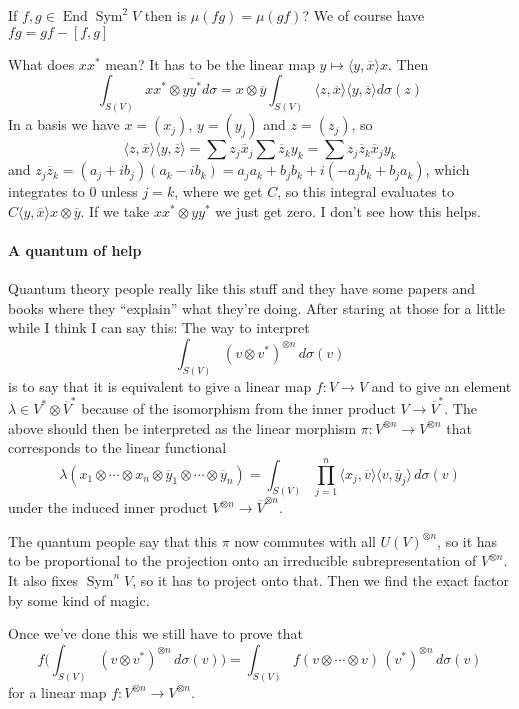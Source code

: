 \documentclass[11pt]{article}
\theoremstyle{definition}
\def\ov#1{\overline{#1}}
\DeclareMathOperator{\End}{End}
\DeclareMathOperator{\Sym}{Sym}
\begin{document}
If $f,g \in \End \Sym^2 V$ then is $\mu(fg) = \mu(gf)$?
We of course have $fg = gf - [f, g]$

What does $xx^*$ mean?
It has to be the linear map $y \mapsto \langle y, \ov x \rangle x$.
Then
$$
\int_{S(V)} x x^* \otimes \ov{yy^*} d\sigma
= x \otimes \ov y \int_{S(V)}
\langle z, \ov x \rangle \langle y, \ov z \rangle d\sigma(z)
$$
In a basis we have $x = (x_j)$, $y = (y_j)$ and $z = (z_j)$, so
$$
\langle z, \ov x \rangle \langle y, \ov z \rangle
= \sum z_j \ov x_j \sum \ov z_k y_k
= \sum z_j \ov z_k \ov x_j y_k
$$
and $z_j \ov z_k = (a_j + ib_j)(a_k - ib_k) = a_ja_k + b_j b_k + i(- a_jb_k +
b_j a_k)$, which integrates to $0$ unless $j = k$, where we get $C$, so this
integral evaluates to $C \langle y, \ov x \rangle x \otimes \ov y$.
If we take $xx^* \otimes yy^*$ we just get zero.
I don't see how this helps.


\paragraph{A quantum of help}

Quantum theory people really like this stuff and they have some papers and
books where they ``explain'' what they're doing.
After staring at those for a little while I think I can say this:
The way to interpret
$$
\int_{S(V)} (v \otimes v^*)^{\otimes n} \, d\sigma(v)
$$
is to say that it is equivalent to give a linear map $f : V \to V$ and to give
an element $\lambda \in V^* \otimes \ov V^*$ because of the isomorphism from
the inner product $V \to \ov V^*$.
The above should then be interpreted as the linear morphism
$\pi : V^{\otimes n} \to V^{\otimes n}$
that corresponds to the linear functional
$$
\lambda(x_1 \otimes \cdots \otimes x_n
\otimes
\ov y_1 \otimes \cdots \otimes \ov y_n)
=
\int_{S(V)} \prod_{j=1}^n
\langle x_j, \ov v \rangle \langle v , \ov y_j \rangle \, d\sigma(v)
$$
under the induced inner product $V^{\otimes n} \to \ov V^{\otimes n}$.

The quantum people say that this $\pi$ now commutes with all $U(V)^{\otimes n}$,
so it has to be proportional to the projection onto an irreducible
subrepresentation of $V^{\otimes n}$.
It also fixes $\Sym^n V$, so it has to project onto that.
Then we find the exact factor by some kind of magic.

Once we've done this we still have to prove that
$$
f\biggl(
\int_{S(V)} (v \otimes v^*)^{\otimes n} \, d\sigma(v)
\biggr)
= \int_{S(V)} f(v \otimes \cdots \otimes v) \, (v^*)^{\otimes n} \, d\sigma(v)
$$
for a linear map $f : V^{\otimes n} \to V^{\otimes n}$.
\end{document}
